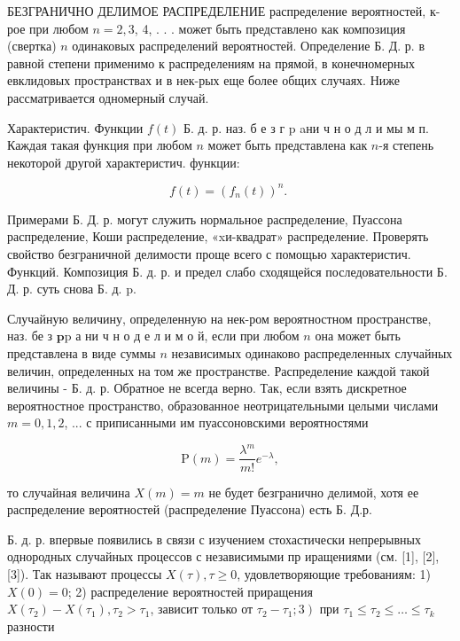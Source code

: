 \documentclass[10pt]{article}
\begin{document}
БЕЗГРАНИЧНО ДЕЛИМОЕ РАСПРЕДЕЛЕНИЕ распределение вероятностей, к-рое при любом $n=2,3$, 4, . . . может быть представлено как композиция (свертка) $n$ одинаковых распределений вероятностей. Определение Б. Д. р. в равной степени применимо к распределениям на прямой, в конечномерных евклидовых пространствах и в нек-рых еще более общих случаях. Ниже рассматривается одномерный случай.



Характеристич. Функции $f(t)$ Б. д. р. наз. б е з г p aни ч н о д л и мы м п. Каждая такая функция при любом $n$ может быть представлена как $n$-я степень некоторой другой характеристич. функции:



\[

f(t)=\left(f_{n}(t)\right)^{n} \text {. }

\]



Примерами Б. Д. р. могут служить нормальное распределение, Пуассона распределение, Коши распределение, «xи-квадрат» распределение. Проверять свойство безграничной делимости проще всего с помощью характеристич. Функций. Композиция Б. д. р. и предел слабо сходящейся последовательности Б. Д. р. суть снова Б. д. p.



Случайную величину, определенную на нек-ром вероятностном пространстве, наз. бе з $\mathbf{p} \mathrm{p}$ а ни ч н о д е л и м о й, если при любом $n$ она может быть представлена в виде суммы $n$ независимых одинаково распределенных случайных величин, определенных на том же пространстве. Распределение каждой такой величины - Б. д. р. Обратное не всегда верно. Так, если взять дискретное вероятностное пространство, образованное неотрицательными целыми числами $m=0,1,2$, ... с приписанными им пуассоновскими вероятностями



\[

\mathrm{P}(m)=\frac{\lambda^{m}}{m !} e^{-\lambda},

\]



то случайная величина $X(m)=m$ не будет безгранично делимой, хотя ее распределение вероятностей (распределение Пуассона) есть Б. Д.р.



Б. д. р. впервые появились в связи с изучением стохастически непрерывных однородных случайных процессов с независимыми пр иращениями (см. [1], [2], [3]). Так называют процессы $X(\tau), \tau \geqslant 0$, удовлетворяющие требованиям: 1) $X(0)=0$; 2) распределение вероятностей приращения $X\left(\tau_{2}\right)-X\left(\tau_{1}\right), \tau_{2}>\tau_{1}$, зависит только от $\left.\tau_{2}-\tau_{1} ; 3\right)$ при $\tau_{1} \leqslant \tau_{2} \leqslant \ldots \leqslant \tau_{k}$ разности
\end{document}
